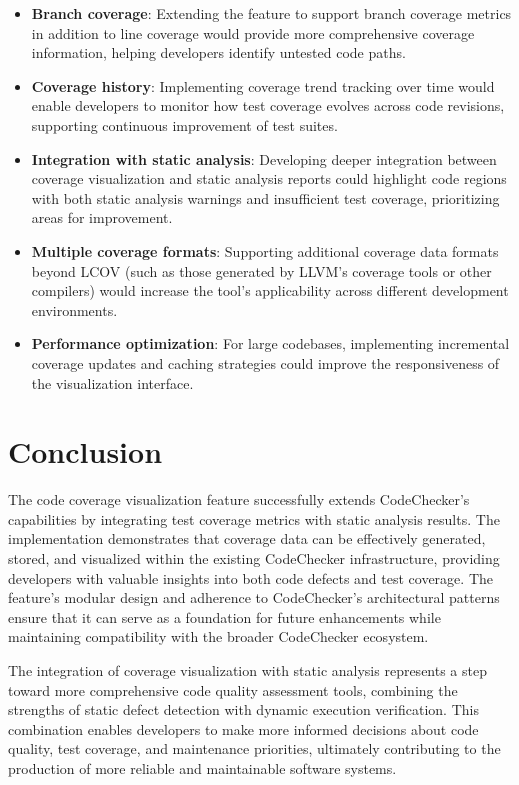 \begin{itemize}
    \item \textbf{Branch coverage}: Extending the feature to support branch coverage metrics in addition to line coverage would provide more comprehensive coverage information, helping developers identify untested code paths.
    \item \textbf{Coverage history}: Implementing coverage trend tracking over time would enable developers to monitor how test coverage evolves across code revisions, supporting continuous improvement of test suites.
    \item \textbf{Integration with static analysis}: Developing deeper integration between coverage visualization and static analysis reports could highlight code regions with both static analysis warnings and insufficient test coverage, prioritizing areas for improvement.
    \item \textbf{Multiple coverage formats}: Supporting additional coverage data formats beyond LCOV (such as those generated by LLVM's coverage tools or other compilers) would increase the tool's applicability across different development environments.
    \item \textbf{Performance optimization}: For large codebases, implementing incremental coverage updates and caching strategies could improve the responsiveness of the visualization interface.
\end{itemize}

\section{Conclusion}

The code coverage visualization feature successfully extends CodeChecker's capabilities by integrating test coverage metrics with static analysis results. The implementation demonstrates that coverage data can be effectively generated, stored, and visualized within the existing CodeChecker infrastructure, providing developers with valuable insights into both code defects and test coverage. The feature's modular design and adherence to CodeChecker's architectural patterns ensure that it can serve as a foundation for future enhancements while maintaining compatibility with the broader CodeChecker ecosystem.

The integration of coverage visualization with static analysis represents a step toward more comprehensive code quality assessment tools, combining the strengths of static defect detection with dynamic execution verification. This combination enables developers to make more informed decisions about code quality, test coverage, and maintenance priorities, ultimately contributing to the production of more reliable and maintainable software systems.
